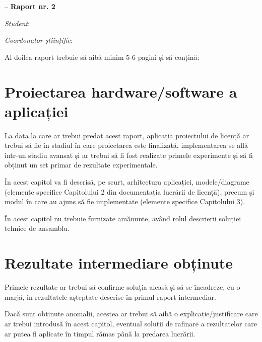 \documentclass[12pt]{report}
\begin{document}


\begin{center}
    \large
    {\textbf{\thesistype} -- \textbf{Raport nr. 2}}
    
    \vspace{0.5cm}
    
    \normalsize
    \textbf{\thesistitle}
\end{center}

\textit{Student}: \textbf{\authornamefl}

\textit{Coordonator științific}: \textbf{\coordinator}

\vspace{0.5cm}

Al doilea raport trebuie să aibă minim 5-6 pagini și să conțină:

\section*{Proiectarea hardware/software a aplicației}

La data la care ar trebui predat acest raport, aplicația proiectului de licență ar trebui să fie în stadiul în care proiectarea este finalizată, implementarea se află într-un stadiu avansat și ar trebui să fi fost realizate primele experimente și să fi obținut un set primar de rezultate experimentale.

În acest capitol va fi descrisă, pe scurt, arhitectura aplicației, modele/diagrame (elemente specifice Capitolului 2 din documentația lucrării de licență), precum și modul în care au ajuns să fie implementate (elemente specifice Capitolului 3).

În acest capitol nu trebuie furnizate amănunte, având rolul descrierii soluției tehnice de ansamblu.

\section*{Rezultate intermediare obținute}

Primele rezultate ar trebui să confirme soluția aleasă și să se încadreze, cu o marjă, în rezultatele așteptate descrise în primul raport intermediar.

Dacă sunt obținute anomalii, acestea ar trebui să aibă o explicație/justificare care ar trebui introdusă în acest capitol, eventual soluții de rafinare a rezultatelor care ar putea fi aplicate în timpul rămas până la predarea lucrării.
\end{document}
